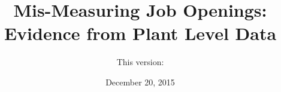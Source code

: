 \documentclass[a4paper,12pt,article]{memoir}
\title{Mis-Measuring Job Openings: \\ Evidence from Plant Level Data}
\author{This version:}
\date{December 20, 2015}
\begin{document}


\maketitle 

\begin{abstract}

\end{abstract}


\newpage

\FloatBarrier	

\FloatBarrier

\FloatBarrier

\FloatBarrier

%
\FloatBarrier

\FloatBarrier
\newpage

\clearpage 

\end{document}
